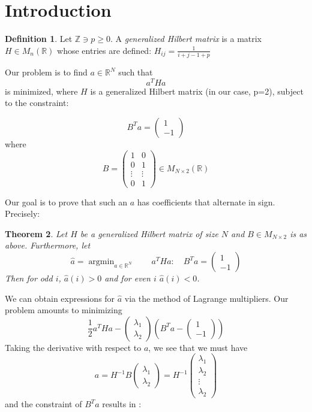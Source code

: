 \documentclass[11pt]{article}
\newtheorem{thm}{Theorem}[section]
\theoremstyle{definition}
\newtheorem{defn}[thm]{Definition}
\theoremstyle{remark}
\numberwithin{equation}{section}
\DeclareMathOperator{\argmin}{argmin}
\begin{document}
\section{Introduction}

\begin{defn} 
Let $\mathbb{Z} \ni p \ge 0$. A \emph{generalized Hilbert matrix} is a matrix $H\in M_n(\mathbb{R})$ whose entries are defined: 
$H_{ij} = \frac{1}{i+j-1+p}$
\end{defn}
Our problem is to find $a\in\mathbb{R}^N$ such that 
\begin{equation}
a^T H a\end{equation}
is minimized, where $H$ is a generalized Hilbert matrix (in our case, p=2), subject to the constraint: 

\begin{equation}
B^T a = \begin{pmatrix} 1 \\ -1\end{pmatrix}
\end{equation}
where \[B = \begin{pmatrix} 1 & 0\\ 
0 & 1 \\
\vdots & \vdots
\\ 
0 & 1 \end{pmatrix} \in M_{N\times 2}(\mathbb{R})\]

Our goal is to prove that such an $a$ has coefficients that alternate in sign. Precisely: 

\begin{thm}
Let $H$ be a generalized Hilbert matrix of size $N$ and $B \in M_{N\times 2}$ is as above. Furthermore, let 
\[ \hat{a} = \argmin_{a\in\mathbb{R}^N} \quad \quad a^THa : \quad B^Ta = \begin{pmatrix} 1 \\ -1 \end{pmatrix}\]
Then for odd $i$, $\hat{a}(i) > 0$ and for even $i$ $\hat{a}(i) < 0$.
\end{thm} 

We can obtain expressions for $\hat{a}$ via the method of Lagrange multipliers. Our problem amounts to minimizing 
\[ \frac{1}{2} a^T H a - \begin{pmatrix} \lambda_1 \\ \lambda_2 \end{pmatrix} (B^Ta - \begin{pmatrix} 1 \\ -1 \end{pmatrix} )\] 
Taking the derivative with respect to $a$, we see that we must have 
\[ a = H^{-1} B \begin{pmatrix} \lambda_1 \\ \lambda_2 \end{pmatrix} = H^{-1} \begin{pmatrix} \lambda_1 \\ \lambda_2 \\ \vdots \\ \lambda_2 \end{pmatrix}\]
and the constraint of $B^Ta$ results in :
\end{document}
